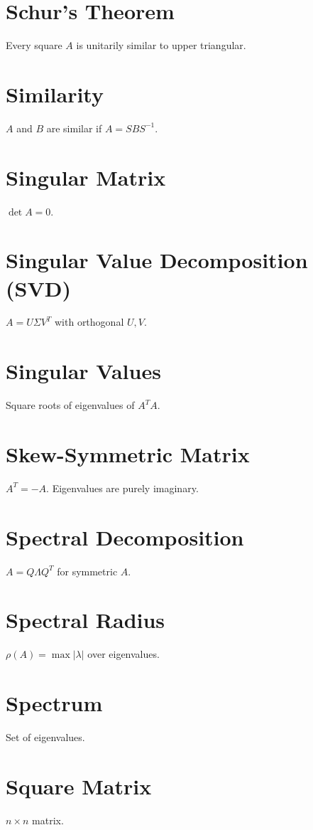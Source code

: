 \documentclass[12pt]{book}
\begin{document}
\chapter{Schur’s Theorem}
Every square $A$ is unitarily similar to upper triangular.

\chapter{Similarity}
$A$ and $B$ are similar if $A=SBS^{-1}$.

\chapter{Singular Matrix}
$\det A=0$.

\chapter{Singular Value Decomposition (SVD)}
$A=U\Sigma V^T$ with orthogonal $U,V$.

\chapter{Singular Values}
Square roots of eigenvalues of $A^TA$.

\chapter{Skew-Symmetric Matrix}
$A^T=-A$. Eigenvalues are purely imaginary.

\chapter{Spectral Decomposition}
$A=Q\Lambda Q^T$ for symmetric $A$.

\chapter{Spectral Radius}
$\rho(A)=\max |\lambda|$ over eigenvalues.

\chapter{Spectrum}
Set of eigenvalues.

\chapter{Square Matrix}
$n \times n$ matrix.
\end{document}

